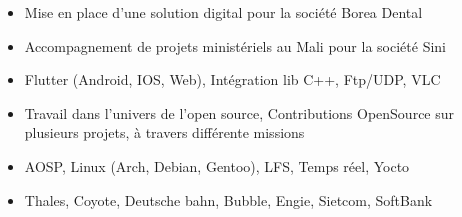\documentclass[10pt,a4paper]{altacv}
\begin{document}
\divider

\begin{itemize}
\item Mise en place d'une solution digital pour la société Borea Dental 
\item Accompagnement de projets ministériels au Mali pour la société Sini
\item Flutter (Android, IOS, Web), Intégration lib C++, Ftp/UDP, VLC
\end{itemize}


\divider

\begin{itemize}
\item Travail dans l'univers de l'open source, Contributions OpenSource sur plusieurs projets, à travers différente missions 
\item AOSP, Linux (Arch, Debian, Gentoo), LFS, Temps réel, Yocto
\item Thales, Coyote, Deutsche bahn, Bubble, Engie, Sietcom, SoftBank
\end{itemize}



\clearpage

\end{document}
